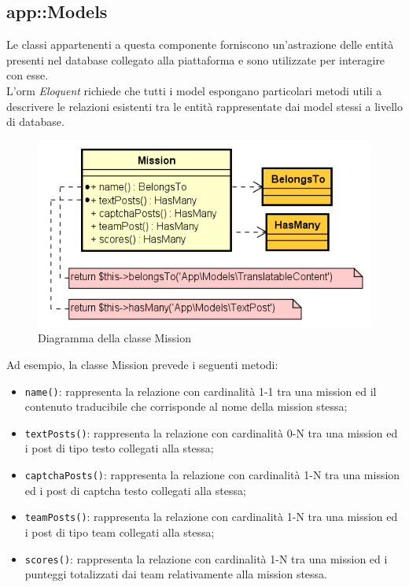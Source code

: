 \subsection{app::Models} %

Le classi appartenenti a questa componente forniscono un'astrazione delle entità presenti nel database collegato alla piattaforma e sono utilizzate per interagire con esse. \\
L'\gls{orm}\glsfirstoccur{} \textit{Eloquent} richiede che tutti i model espongano particolari metodi utili a descrivere le relazioni esistenti tra le entità rappresentate dai model stessi a livello di database.

\begin{figure}[H]
	\centering
  \includegraphics[scale=0.7]{immagini/components/mission.png}
  \caption{Diagramma della classe Mission}
	\label{fig:mission} 
\end{figure}

Ad esempio, la classe Mission prevede i seguenti metodi:

\begin{itemize}
	\item \verb!name()!: rappresenta la relazione con cardinalità 1-1 tra una mission ed il contenuto traducibile che corrisponde al nome della mission stessa;
	\item \verb!textPosts()!: rappresenta la relazione con cardinalità 0-N tra una mission ed i post di tipo testo collegati alla stessa;
	\item \verb!captchaPosts()!: rappresenta la relazione con cardinalità 1-N tra una mission ed i post di captcha testo collegati alla stessa;
	\item \verb!teamPosts()!: rappresenta la relazione con cardinalità 1-N tra una mission ed i post di tipo team collegati alla stessa;
	\item \verb!scores()!: rappresenta la relazione con cardinalità 1-N tra una mission ed i punteggi totalizzati dai team relativamente alla mission stessa.
\end{itemize}

